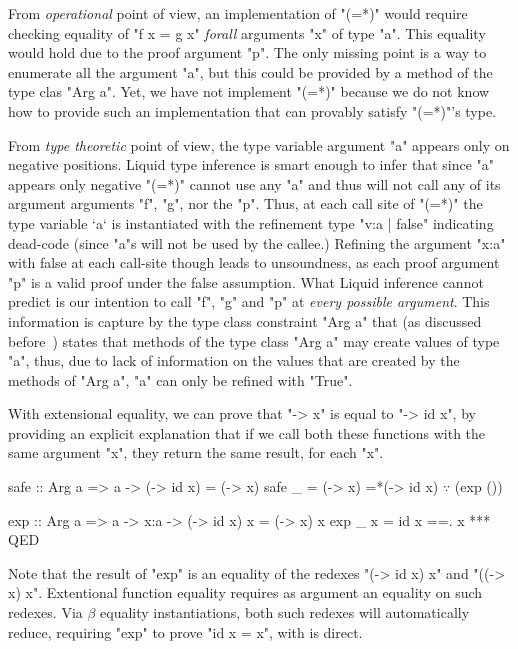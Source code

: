 From \textit{operational} point of view,
an implementation of "(=*)" would require checking
equality of "f x = g x" \textit{forall} arguments "x" of type "a".
%
This equality would hold due to the proof argument "p".
%
The only missing point is a way to enumerate all the argument "a",
but this could be provided by a method of the type clas "Arg a".
%
Yet, we have not implement "(=*)" because we do not know how to
provide such an implementation that can provably satisfy "(=*)"'s type.

From \textit{type theoretic} point of view,
the type variable argument "a"
appears only on negative positions.
%
Liquid type inference is smart enough to infer that
since "a" appears only negative "(=*)" cannot use any "a"
and thus will not call any of its argument arguments "f", "g", nor the "p".
%
Thus, at each call site of "(=*)" the type variable `a` is instantiated
with the refinement type "{v:a | false}" indicating dead-code
(since "a"s will not be used by the callee.)
%
Refining the argument "x:a" with false at each call-site though
leads to unsoundness, as each proof argument "p" is a valid proof under
the false assumption.
%
What Liquid inference cannot predict is our intention to call
"f", "g" and "p" at \textit{every possible argument}.
%
This information is capture by the type class constraint "Arg a"
that (as discussed before~\citep{Vazou13}) states that methods of
the type class
"Arg a" may create values of type "a", thus,
due to lack of information on the values that are created by the
methods of "Arg a", "a" can only be refined with "True".

With extensional equality, we can prove
that "\x -> x" is equal to "\x -> id x",
by providing an explicit explanation that
if we call both these functions with the same
argument "x", they return the same result, for each "x".
%
\begin{mcode}
 safe :: Arg a => a
       -> {(\x -> id x) = (\x -> x)}
 safe _  = (\x -> x)
         =*(\x -> id x) $\because$ (exp ())

 exp :: Arg a => a -> x:a
     -> {(\x -> id x) x = (\x -> x) x}
 exp _ x =  id x
         ==. x
         *** QED
\end{mcode}
%
Note that the result of "exp"
is an equality of the redexes
"(\x -> id x) x" and "((\x -> x) x".
%
Extentional function equality requires
as argument an equality on such redexes.
%
Via $\beta$ equality instantiations,
both such redexes will automatically reduce,
requiring "exp" to prove "id x = x",
with is direct.

